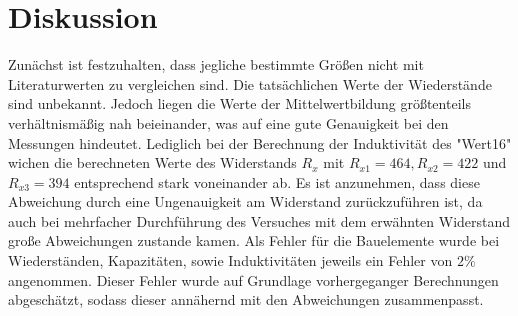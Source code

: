 \section{Diskussion}
\label{sec:Diskussion}

Zunächst ist festzuhalten, dass jegliche bestimmte Größen nicht mit Literaturwerten 
zu vergleichen sind. Die tatsächlichen Werte der Wiederstände sind unbekannt.
Jedoch liegen die Werte der Mittelwertbildung größtenteils verhältnismäßig nah
beieinander, was auf eine gute Genauigkeit bei den Messungen hindeutet. 
Lediglich bei der Berechnung der Induktivität des "Wert16" wichen die berechneten
Werte des Widerstands $R_x$ mit $R_{x1} = 464, R_{x2} = 422$ und $R_{x3} = 394$ 
entsprechend stark voneinander ab.
Es ist anzunehmen, dass diese Abweichung durch eine Ungenauigkeit am Widerstand 
zurückzuführen ist, da auch bei mehrfacher Durchführung des Versuches mit dem 
erwähnten Widerstand große Abweichungen zustande kamen.
Als Fehler für die Bauelemente wurde bei Wiederständen, Kapazitäten, sowie 
Induktivitäten jeweils ein Fehler von $2 \%$ angenommen. Dieser Fehler wurde
auf Grundlage vorhergeganger Berechnungen abgeschätzt, sodass dieser annähernd
mit den Abweichungen zusammenpasst.
